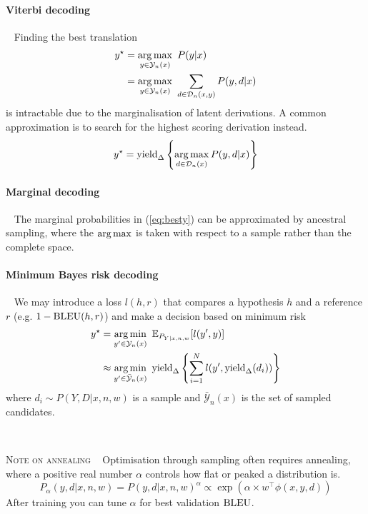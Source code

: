 \paragraph{Viterbi decoding} ~ Finding the best translation 
\begin{equation}\label{eq:besty}
\begin{aligned}
y^\star &= \operatorname*{arg\,max}_{y \in \mathcal Y_n(x)} ~ P(y|x) \\
 &= \operatorname*{arg\,max}_{y \in \mathcal Y_n(x)} ~ \sum_{d \in \mathcal D_n(x, y)} P(y, d|x)
\end{aligned}
\end{equation}
is intractable due to the marginalisation of latent derivations. A common approximation is to search for the highest scoring derivation instead.
\begin{equation}
y^\star = \operatorname{yield}_\Delta \left\{ \operatorname*{arg\,max}_{d \in \mathcal D_n(x)} P(y, d|x) \right\}
\end{equation}

\paragraph{Marginal decoding}  ~ The marginal probabilities in (\ref{eq:besty}) can be approximated by ancestral sampling, where the $\operatorname*{arg\,max}$ is taken with respect to a sample rather than the complete space. 

\paragraph{Minimum Bayes risk decoding}  ~ We may introduce a loss $l(h, r)$ that compares a hypothesis $h$ and a reference $r$ (e.g. $1 - \operatorname{BLEU}(h, r)$) and make a decision based on minimum risk
\begin{equation}
\begin{aligned}
y^\star &= \operatorname*{arg\,min}_{y' \in \mathcal Y_n(x)} ~ \mathbb E_{P_{Y|x, n, w}}[l(y', y)]  \\
 &\approx \operatorname*{arg\,min}_{y' \in \bar{\mathcal Y}_n(x)} ~ \operatorname{yield}_\Delta \left\{ \sum_{i=1}^N  l(y', \operatorname{yield}_\Delta(d_i)) \right\} 
\end{aligned}
\end{equation}
where $d_i \sim P(Y, D|x, n, w)$ is a sample and $\bar{\mathcal Y}_n(x)$ is the set of sampled candidates.

~


\noindent\textsc{Note on annealing} ~ Optimisation through sampling often requires annealing, where a positive real number $\alpha$ controls how flat or peaked a distribution is.
\begin{equation}
	P_\alpha(y, d|x, n, w) = P(y, d|x, n, w)^\alpha \propto \exp\left(\alpha \times w^\top \phi(x, y, d)\right)
\end{equation}
After training you can tune $\alpha$ for best validation $\operatorname{BLEU}$.

